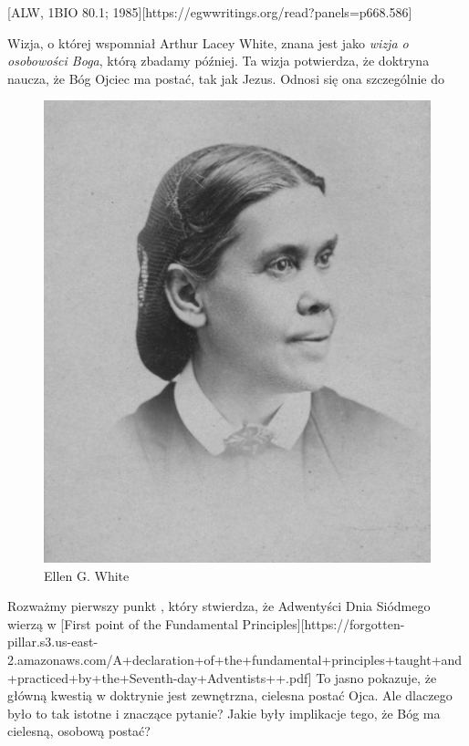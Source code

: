 [ALW, 1BIO 80.1; 1985][https://egwwritings.org/read?panels=p668.586]

Wizja, o której wspomniał Arthur Lacey White, znana jest jako \textit{wizja o osobowości Boga}, którą zbadamy później. Ta wizja potwierdza, że doktryna  naucza, że Bóg Ojciec ma postać, tak jak Jezus. Odnosi się ona szczególnie do 

\begin{figure}[t]
    \centering
    \includegraphics[width=0.65\linewidth]{images/ellen-white.jpg}
    \caption*{Ellen G. White}
    \label{fig:ellen-g-white}
\end{figure}

Rozważmy pierwszy punkt , który stwierdza, że Adwentyści Dnia Siódmego wierzą w [First point of the Fundamental Principles][https://forgotten-pillar.s3.us-east-2.amazonaws.com/A+declaration+of+the+fundamental+principles+taught+and+practiced+by+the+Seventh-day+Adventists++.pdf] To jasno pokazuje, że główną kwestią w doktrynie  jest zewnętrzna, cielesna postać Ojca. Ale dlaczego było to tak istotne i znaczące pytanie? Jakie były implikacje tego, że Bóg ma cielesną, osobową postać?

